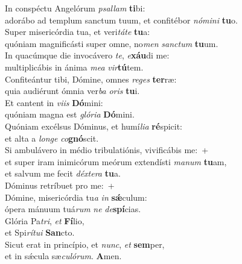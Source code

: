 \evenverse In conspéctu Angelórum \textit{psal}\textit{lam} \textbf{ti}bi:~\*\\
\evenverse adorábo ad templum sanctum tuum, et confitébor \textit{nó}\textit{mi}\textit{ni} \textbf{tu}o.\\
\oddverse Super misericórdia tua, et veri\textit{tá}\textit{te} \textbf{tu}a:~\*\\
\oddverse quóniam magnificásti super omne, no\textit{men} \textit{san}\textit{ctum} \textbf{tu}um.\\
\evenverse In quacúmque die invocávero \textit{te}, \textit{e}\textbf{xáu}di me:~\*\\
\evenverse multiplicábis in ánima \textit{me}\textit{a} \textit{vir}\textbf{tú}tem.\\
\oddverse Confiteántur tibi, Dómine, omnes \textit{re}\textit{ges} \textbf{ter}ræ:~\*\\
\oddverse quia audiérunt ómnia ver\textit{ba} \textit{o}\textit{ris} \textbf{tu}i.\\
\evenverse Et cantent in \textit{vi}\textit{is} \textbf{Dó}mini:~\*\\
\evenverse quóniam magna est \textit{gló}\textit{ri}\textit{a} \textbf{Dó}mini.\\
\oddverse Quóniam excélsus Dóminus, et humí\textit{li}\textit{a} \textbf{ré}spicit:~\*\\
\oddverse et alta a \textit{lon}\textit{ge} \textit{co}\textbf{gnó}scit.\\
\evenverse Si ambulávero in médio tribulatiónis, vivificábis me:~+\\
\evenverse  et super iram inimicórum meórum extendísti \textit{ma}\textit{num} \textbf{tu}am,~\*\\
\evenverse et salvum me fecit \textit{déx}\textit{te}\textit{ra} \textbf{tu}a.\\
\oddverse Dóminus retríbuet pro me:~+\\
\oddverse  Dómine, misericórdia tu\textit{a} \textit{in} \textbf{sǽ}culum:~\*\\
\oddverse ópera mánuum tuá\textit{rum} \textit{ne} \textit{de}\textbf{spí}cias.\\
\evenverse Glória Pa\textit{tri}, \textit{et} \textbf{Fí}lio,~\*\\
\evenverse et Spi\textit{rí}\textit{tu}\textit{i} \textbf{San}cto.\\
\oddverse Sicut erat in princípio, et \textit{nunc}, \textit{et} \textbf{sem}per,~\*\\
\oddverse et in sǽcula sæ\textit{cu}\textit{ló}\textit{rum}. \textbf{A}men.\\
